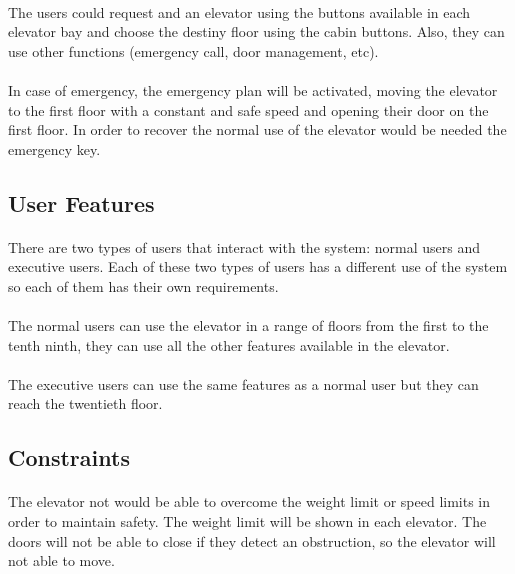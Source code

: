 \documentclass[12pt]{article}
\begin{document}
		\paragraph{} The users could request and an elevator using the buttons available in 
		each elevator bay and choose the destiny floor using the cabin buttons. Also, they 
		can use other functions (emergency call, door management, etc).
		
		\paragraph{} In case of emergency, the emergency plan will be activated, moving the 
		elevator to the first floor with a constant and safe speed and opening their door on 
		the first floor. In order to recover the normal use of the elevator would be needed 
		the emergency key.

	\subsection{User Features}
		\paragraph{} There are two types of users that interact with the system: normal users 
		and executive users. Each of these two types of users has a different use of the system 
		so each of them has their own requirements.
		
		\paragraph{} The normal users can use the elevator in a range of floors from the first 
		to the tenth ninth, they can use all the other features available in the elevator.
		
		\paragraph{} The executive users can use the same features as a normal user but they 
		can reach the twentieth floor.
	
	\subsection{Constraints}
		\paragraph{}The elevator not would be able to overcome the weight limit or speed 
		limits in order to maintain safety. The weight limit will be shown in each elevator. 
		The doors will not be able to close if they detect an obstruction, so the elevator 
		will not able to move.
\end{document}
